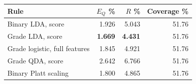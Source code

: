 \begin{tabular}{@{}lrrr@{}}
\toprule
Rule & $E_Q$ \% & $R$ \% & Coverage \% \\
\midrule
Binary LDA, score & 1.926 & 5.043 & 51.76 \\
Grade LDA, score & \textbf{1.669} & \textbf{4.431} & 51.76 \\
Grade logistic, full features & 1.845 & 4.921 & 51.76 \\
Grade QDA, score & 2.642 & 6.766 & 51.76 \\
Binary Platt scaling & 1.800 & 4.865 & 51.76 \\
\bottomrule
\end{tabular}
